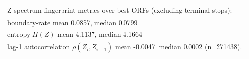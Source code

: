 \begin{tabular}{@{}l@{}}
Z-spectrum fingerprint metrics over best ORFs (excluding terminal stops):\\
boundary-rate mean 0.0857, median 0.0799\\
entropy $H(Z)$ mean 4.1137, median 4.1664\\
lag-1 autocorrelation $\rho(Z_i,Z_{i+1})$ mean -0.0047, median 0.0002 (n=271438).
\end{tabular}

